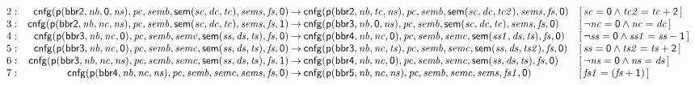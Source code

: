 \documentclass[a4paper]{article}
\newcommand{\symb}[1]{\mathsf{#1}}
\newcommand{\var}[1]{\mathit{#1}}
\newcommand{\Constraint}[1]{[\, #1 \,]}
\begin{document}
\begin{landscape}
\[\begin{array}{rr@{\>}c@{\>}ll}
\mathrm{2} : 
 & \symb{cnfg}(\symb{p}(\symb{bbr2},\var{nb},\symb{0},\var{ns}),\var{pc},\var{semb},\symb{sem}(\var{sc},\var{dc},\var{tc}),\var{sems},\var{fs},\symb{0})
 & \to 
 & \symb{cnfg}(\symb{p}(\symb{bbr2},\var{nb},\var{tc},\var{ns}),\var{pc},\var{semb},\symb{sem}(\var{sc},\var{dc},\var{tc2}),\var{sems},\var{fs},\symb{0})
 & \Constraint{\var{sc} = \symb{0} \land \var{tc2} = \var{tc} + \symb{2}}\\

\mathrm{3} : 
 & \symb{cnfg}(\symb{p}(\symb{bbr2},\var{nb},\var{nc},\var{ns}),\var{pc},\var{semb},\symb{sem}(\var{sc},\var{dc},\var{tc}),\var{sems},\var{fs},\symb{1})
 & \to 
 & \symb{cnfg}(\symb{p}(\symb{bbr3},\var{nb},\symb{0},\var{ns}),\var{pc},\var{semb},\symb{sem}(\var{sc},\var{dc},\var{tc}),\var{sems},\var{fs},\symb{0})
 & \Constraint{\neg \var{nc} = \symb{0} \land \var{nc} = \var{dc}}\\

\mathrm{4} : 
 & \symb{cnfg}(\symb{p}(\symb{bbr3},\var{nb},\var{nc},\symb{0}),\var{pc},\var{semb},\var{semc},\symb{sem}(\var{ss},\var{ds},\var{ts}),\var{fs},\symb{0})
 & \to 
 & \symb{cnfg}(\symb{p}(\symb{bbr4},\var{nb},\var{nc},\symb{0}),\var{pc},\var{semb},\var{semc},\symb{sem}(\var{ss1},\var{ds},\var{ts}),\var{fs},\symb{0})
 & \Constraint{\neg \var{ss} = \symb{0} \land \var{ss1} = \var{ss} - \symb{1}}\\

\mathrm{5} : 
 & \symb{cnfg}(\symb{p}(\symb{bbr3},\var{nb},\var{nc},\symb{0}),\var{pc},\var{semb},\var{semc},\symb{sem}(\var{ss},\var{ds},\var{ts}),\var{fs},\symb{0})
 & \to 
 & \symb{cnfg}(\symb{p}(\symb{bbr3},\var{nb},\var{nc},\var{ts}),\var{pc},\var{semb},\var{semc},\symb{sem}(\var{ss},\var{ds},\var{ts2}),\var{fs},\symb{0})
 & \Constraint{\var{ss} = \symb{0} \land \var{ts2} = \var{ts} + \symb{2}}\\

\mathrm{6} : 
 & \symb{cnfg}(\symb{p}(\symb{bbr3},\var{nb},\var{nc},\var{ns}),\var{pc},\var{semb},\var{semc},\symb{sem}(\var{ss},\var{ds},\var{ts}),\var{fs},\symb{1})
 & \to 
 & \symb{cnfg}(\symb{p}(\symb{bbr4},\var{nb},\var{nc},\symb{0}),\var{pc},\var{semb},\var{semc},\symb{sem}(\var{ss},\var{ds},\var{ts}),\var{fs},\symb{0})
 & \Constraint{\neg \var{ns} = \symb{0} \land \var{ns} = \var{ds}}\\

\mathrm{7} : 
 & \symb{cnfg}(\symb{p}(\symb{bbr4},\var{nb},\var{nc},\var{ns}),\var{pc},\var{semb},\var{semc},\var{sems},\var{fs},\symb{0})
 & \to 
 & \symb{cnfg}(\symb{p}(\symb{bbr5},\var{nb},\var{nc},\var{ns}),\var{pc},\var{semb},\var{semc},\var{sems},\var{fs1},\symb{0})
 & \Constraint{\var{fs1} = (\var{fs} + \symb{1})}\\


\end{array}\]
\end{landscape}
\end{document}
